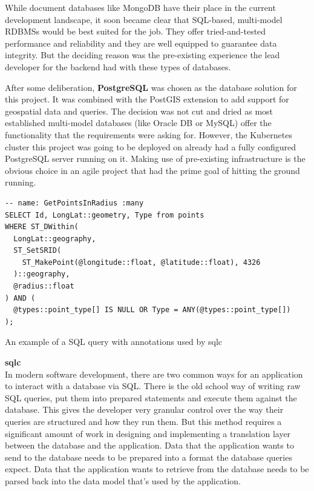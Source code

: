 While document databases like MongoDB have their place in the current
development landscape, it soon became clear that SQL-based, multi-model RDBMSs
would be best suited for the job. They offer tried-and-tested performance and
reliability and they are well equipped to guarantee data integrity. But the
deciding reason was the pre-existing experience the lead developer for the
backend had with these types of databases.

After some deliberation, \textbf{PostgreSQL} was chosen as the database solution
for this project. It was combined with the PostGIS extension to add support for
geospatial data and queries. The decision was not cut and dried as most
established multi-model databases (like Oracle DB or MySQL) offer the
functionality that the requirements were asking for. However, the Kubernetes
cluster this project was going to be deployed on already had a fully configured
PostgreSQL server running on it. Making use of pre-existing infrastructure is
the obvious choice in an agile project that had the prime goal of hitting the
ground running.

\begin{listing}[htbp]
  \centering{}
  \begin{minipage}{0.85\textwidth}
  \begin{verbatim}
-- name: GetPointsInRadius :many
SELECT Id, LongLat::geometry, Type from points
WHERE ST_DWithin(
  LongLat::geography,
  ST_SetSRID(
    ST_MakePoint(@longitude::float, @latitude::float), 4326
  )::geography,
  @radius::float
) AND (
  @types::point_type[] IS NULL OR Type = ANY(@types::point_type[])
);
  \end{verbatim}
  \end{minipage}
  \caption{An example of a SQL query with annotations used by sqlc}
  \label{listing:sqlc_query_input}
\end{listing}

\textbf{sqlc}\\
In modern software development, there are two common ways for an application to
interact with a database via SQL. There is the old school way of writing raw SQL
queries, put them into prepared statements and execute them against the
database. This gives the developer very granular control over the way their
queries are structured and how they run them. But this method requires a
significant amount of work in designing and implementing a translation layer
between the database and the application. Data that the application wants to
send to the database needs to be prepared into a format the database queries
expect. Data that the application wants to retrieve from the database needs to
be parsed back into the data model that's used by the application.

